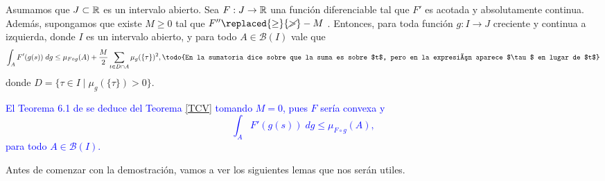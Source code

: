\begin{thm}\label{TCV}
Asumamos que $J\subset\mathbb{R}$ es un intervalo abierto. Sea $F:J\to \mathbb{R}$ una función diferenciable tal que $F'$ es acotada y absolutamente continua. Además,  supongamos que existe $M\geq 0$ tal que $F''\replaced{\geq}{\cancel{>}}-M$ . Entonces, para toda función $g:I\to J$ creciente y  continua a izquierda,  donde $I$ es un intervalo abierto, y para todo $A\in \mathcal{B}(I)$ vale que
$$\int_{A}F'(g(s)) \; dg\leq \mu_{F\circ g}(A)+\dfrac{M}{2}\sum_{t\in D\cap A}\mu_{g}(\{\tau\})^2,\textrm{\todo{En la sumatoria dice sobre que la suma es sobre $t$, pero en la expresión aparece $\tau$ en lugar de $t$}}$$
donde $D=\{\tau\in I \mid \mu_{g}(\{\tau\})>0\}$.\label{Teorema medidas}
\end{thm}
 

\begin{obs} \label{Teorema 6.1}
\textcolor{blue}{El Teorema 6.1  de \cite{P.Mazzone} se deduce del Teorema  \ref{TCV} tomando $M=0$, pues $F$ sería convexa y 
$$\int_{A}F'(g(s)) \; dg\leq \mu_{F\circ g}(A),$$
para todo $A\in \mathcal{B}(I)$.}
\end{obs}
Antes de comenzar con la demostración, vamos a ver los siguientes lemas que nos serán utiles.

